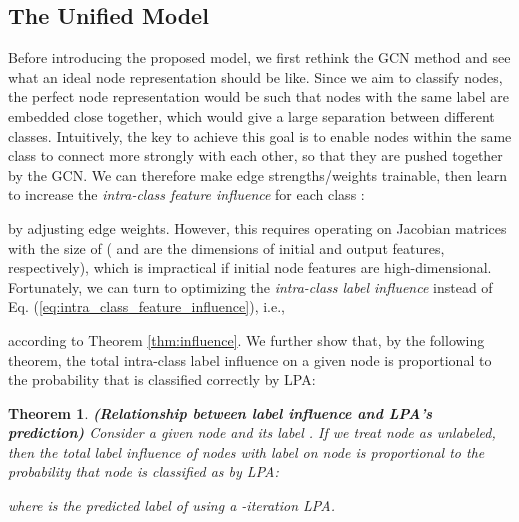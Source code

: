 \documentclass{article}
\newtheorem{theorem}{Theorem}
\begin{document}
		
	\subsection{The Unified Model}
	\label{sec:model}
		Before introducing the proposed model, we first rethink the GCN method and see what an ideal node representation should be like.
		Since we aim to classify nodes, the perfect node representation would be such that nodes with the same label are embedded close together, which would give a large separation between different classes.
Intuitively, the key to achieve this goal is to enable nodes within the same class to connect more strongly with each other, so that they are pushed together by the GCN.
		We can therefore make edge strengths/weights trainable, then learn to increase the \textit{intra-class feature influence} for each class :
		
		by adjusting edge weights.
		However, this requires operating on Jacobian matrices with the size of  ( and  are the dimensions of initial and output features, respectively), which is impractical if initial node features are high-dimensional.
		Fortunately, we can turn to optimizing the \textit{intra-class label influence} instead of Eq. (\ref{eq:intra_class_feature_influence}), i.e.,
		
		according to Theorem \ref{thm:influence}.
		We further show that, by the following theorem, the total intra-class label influence on a given node  is proportional to the probability that  is classified correctly by LPA:
		\begin{theorem}
		\label{thm:lpa}
			\rm\textbf{(Relationship between label influence and LPA's prediction)}
			Consider a given node  and its label .
			If we treat node  as unlabeled, then the total label influence of nodes with label  on node  is proportional to the probability that node  is classified as  by LPA:
			
			where  is the predicted label of  using a -iteration LPA.
		\end{theorem}
		
\end{document}
